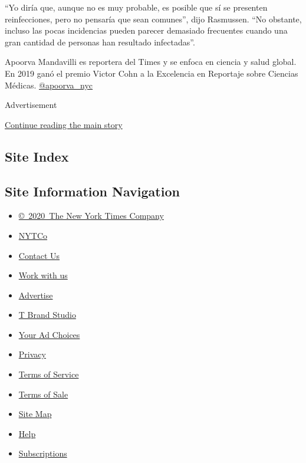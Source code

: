 ``Yo diría que, aunque no es muy probable, es posible que sí se
presenten reinfecciones, pero no pensaría que sean comunes'', dijo
Rasmussen. ``No obstante, incluso las pocas incidencias pueden parecer
demasiado frecuentes cuando una gran cantidad de personas han resultado
infectadas''.

Apoorva Mandavilli es reportera del Times y se enfoca en ciencia y salud
global. En 2019 ganó el premio Victor Cohn a la Excelencia en Reportaje
sobre Ciencias Médicas.
\href{https://twitter.com/apoorva_nyc}{@apoorva\_nyc}

Advertisement

\protect\hyperlink{after-bottom}{Continue reading the main story}

\hypertarget{site-index}{%
\subsection{Site Index}\label{site-index}}

\hypertarget{site-information-navigation}{%
\subsection{Site Information
Navigation}\label{site-information-navigation}}

\begin{itemize}
\tightlist
\item
  \href{https://help.nytimes.com/hc/en-us/articles/115014792127-Copyright-notice}{©~2020~The
  New York Times Company}
\end{itemize}

\begin{itemize}
\tightlist
\item
  \href{https://www.nytco.com/}{NYTCo}
\item
  \href{https://help.nytimes.com/hc/en-us/articles/115015385887-Contact-Us}{Contact
  Us}
\item
  \href{https://www.nytco.com/careers/}{Work with us}
\item
  \href{https://nytmediakit.com/}{Advertise}
\item
  \href{http://www.tbrandstudio.com/}{T Brand Studio}
\item
  \href{https://www.nytimes.com/privacy/cookie-policy\#how-do-i-manage-trackers}{Your
  Ad Choices}
\item
  \href{https://www.nytimes.com/privacy}{Privacy}
\item
  \href{https://help.nytimes.com/hc/en-us/articles/115014893428-Terms-of-service}{Terms
  of Service}
\item
  \href{https://help.nytimes.com/hc/en-us/articles/115014893968-Terms-of-sale}{Terms
  of Sale}
\item
  \href{https://spiderbites.nytimes.com}{Site Map}
\item
  \href{https://help.nytimes.com/hc/en-us}{Help}
\item
  \href{https://www.nytimes.com/subscription?campaignId=37WXW}{Subscriptions}
\end{itemize}

